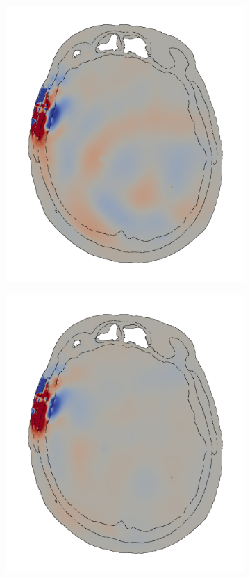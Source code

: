 \documentclass[a4paper]{article}
\numberwithin{equation}{section}
\begin{document}
\begin{figure}[H]
\begin{subfigure}{.25\textwidth}
\end{subfigure}
\begin{subfigure}{.25\textwidth}
  \centering
  \includegraphics[width=1.0\linewidth]{pictures/skull/elastic-pressure-z-with-bounds/six/5.png}
\end{subfigure}
\begin{subfigure}{.25\textwidth}
  \centering
  \includegraphics[width=1.0\linewidth]{pictures/skull/elastic-pressure-z-with-bounds/six/6.png}

\end{subfigure}
\end{figure}
\end{document}
